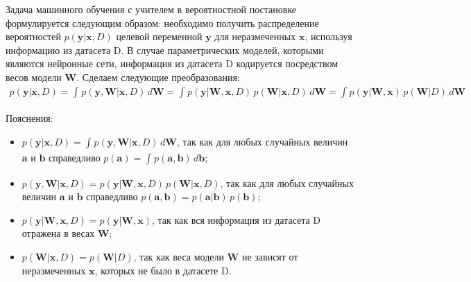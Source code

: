 \documentclass{article}
\numberwithin{equation}{section}
\begin{document}
    Задача машинного обучения с учителем
    в вероятностной постановке формулируется следующим образом:
    необходимо получить распределение вероятностей
    $p(\pmb{y} | \pmb{x}, D)$
    целевой переменной $\pmb{y}$
    для неразмеченных $\pmb{x}$, используя информацию из датасета D.
    В случае параметрических моделей, которыми являются нейронные сети,
    информация из датасета D кодируется посредством весов модели $\pmb{W}$.
    Сделаем следующие преобразования:
    \begin{equation}\label{pred_distribution}
    \begin{split}
        p(\pmb{y} | \pmb{x}, D)
        =
        \int_{}{
            p(\pmb{y}, \pmb{W} | \pmb{x}, D)
            \,
            d\pmb{W}
        }
        =
        \int_{}{
            p(\pmb{y} | \pmb{W}, \pmb{x}, D)
            \,
            p(\pmb{W} | \pmb{x}, D)
            \,
            d\pmb{W}
        }
        =
        \int_{}{
            p(\pmb{y} | \pmb{W}, \pmb{x})
            \,
            p(\pmb{W} | D)
            \,
            d\pmb{W}
        }
    \end{split}
    \end{equation}

    Пояснения:
    \begin{itemize}
    \item
        $
            p(\pmb{y} | \pmb{x}, D)
            =
            \int_{}{
                p(\pmb{y}, \pmb{W} | \pmb{x}, D)
                \,
                d\pmb{W}
            }
        $, так как для любых случайных величин
        $\pmb{a}$ и $\pmb{b}$ справедливо
        $
            p(\pmb{a})
            =
            \int_{}{
                p(\pmb{a}, \pmb{b})
                \,
                d\pmb{b}
            }
        $;
    \item
        $
            p(\pmb{y}, \pmb{W} | \pmb{x}, D)
            =
            p(\pmb{y} | \pmb{W}, \pmb{x}, D)
            \,
            p(\pmb{W} | \pmb{x}, D)
        $, так как для любых случайных величин $\pmb{a}$ и $\pmb{b}$ справедливо
        $
            p(\pmb{a}, \pmb{b})
            =
            p(\pmb{a}| \pmb{b})
            \,
            p(\pmb{b})
        $;
    \item
        $
            p(\pmb{y} | \pmb{W}, \pmb{x}, D)
            =
            p(\pmb{y} | \pmb{W}, \pmb{x})
        $, так как вся информация из датасета D отражена в весах $\pmb{W}$;
    \item
        $
            p(\pmb{W} | \pmb{x}, D)
            =
            p(\pmb{W} | D)
        $, так как веса модели $\pmb{W}$ не зависят от неразмеченных
        $\pmb{x}$, которых не было в датасете D.
    \end{itemize}
\end{document}
